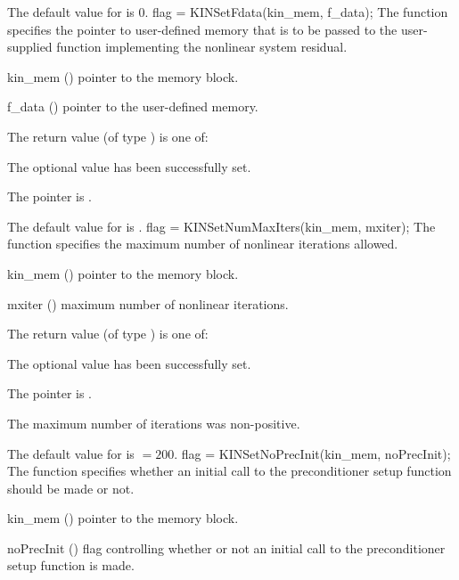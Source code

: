 {
  The default value for  is $0$.
}
{
flag = KINSetFdata(kin\_mem, f\_data);
}
{
  The function  specifies the pointer to user-defined memory
  that is to be passed to the user-supplied function implementing the nonlinear
  system residual.
}
{
  \begin{args}
  \item[kin\_mem] ()
    pointer to the {\kinsol} memory block.
  \item[f\_data] ()
    pointer to the user-defined memory.
  \end{args}
}
{
  The return value  (of type ) is one of:
  \begin{args}
  \item[\Id{KIN\_SUCCESS}] 
    The optional value has been successfully set.
  \item[\Id{KIN\_MEM\_NULL}]
    The  pointer is .
  \end{args}
}
{
  The default value for  is .
}
{
flag = KINSetNumMaxIters(kin\_mem, mxiter);
}
{
  The function  specifies the maximum number of 
  nonlinear iterations allowed.
}
{
  \begin{args}
  \item[kin\_mem] ()
    pointer to the {\kinsol} memory block.
  \item[mxiter] ()
    maximum number of nonlinear iterations.
  \end{args}
}
{
  The return value  (of type ) is one of:
  \begin{args}
  \item[\Id{KIN\_SUCCESS}] 
    The optional value has been successfully set.
  \item[\Id{KIN\_MEM\_NULL}]
    The  pointer is .
  \item[\Id{KIN\_ILL\_INPUT}]
    The maximum number of iterations was non-positive.
  \end{args}
}
{
  The default value for  is  $=200$.
}
{
flag = KINSetNoPrecInit(kin\_mem, noPrecInit);
}
{
  The function  specifies whether an initial call
  to the preconditioner setup function should be made or not.
}
{
  \begin{args}[noPrecInit]
  \item[kin\_mem] ()
    pointer to the {\kinsol} memory block.
  \item[noPrecInit] ()
    flag controlling whether or not an initial call 
    to the preconditioner setup function is made.
  \end{args}
}
